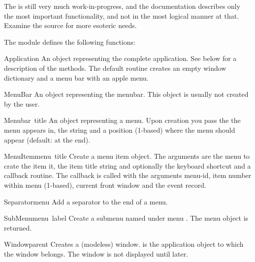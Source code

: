 The  is still very much work-in-progress, and the
documentation describes only the most important functionality, and not
in the most logical manner at that. Examine the source for more
esoteric needs. 

The  module defines the following functions:

\renewcommand{\indexsubitem}{(in module FrameWork)}

\begin{funcdesc}{Application}{}
An object representing the complete application. See below for a
description of the methods. The default  routine
creates an empty window dictionary and a menu bar with an apple menu.
\end{funcdesc}

\begin{funcdesc}{MenuBar}{}
An object representing the menubar. This object is usually not created
by the user.
\end{funcdesc}

\begin{funcdesc}{Menu}{bar\, title}
An object representing a menu. Upon creation you pass the
 the menu appears in, the  string and a
position (1-based)  where the menu should appear (default:
at the end).
\end{funcdesc}

\begin{funcdesc}{MenuItem}{menu\, title}
Create a menu item object. The arguments are the menu to crate the
item it, the item title string and optionally the keyboard shortcut
and a callback routine. The callback is called with the arguments
menu-id, item number within menu (1-based), current front window and
the event record.
\end{funcdesc}

\begin{funcdesc}{Separator}{menu}
Add a separator to the end of a menu.
\end{funcdesc}

\begin{funcdesc}{SubMenu}{menu\, label}
Create a submenu named  under menu . The menu
object is returned.
\end{funcdesc}

\begin{funcdesc}{Window}{parent}
Creates a (modeless) window.  is the application object to
which the window belongs. The window is not displayed until later.
\end{funcdesc}


